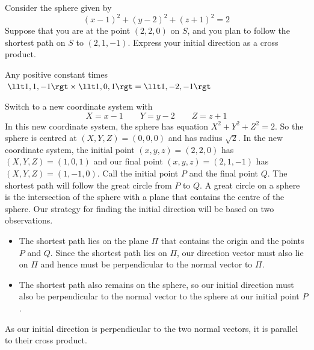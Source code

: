 \begin{question} [M200 2003A] %
Consider the sphere given by
$$
(x-1)^2+(y-2)^2+(z+1)^2=2
$$
Suppose that you are at the point $(2,2,0)$ on $S$, and you plan to follow
the shortest path on $S$ to $(2,1,-1)$. Express your initial direction
as a cross product.
\end{question}

%

\begin{answer}
Any positive constant times
$\llt 1,1,-1\rgt\times\llt 1,0,1\rgt
=\llt 1, -2, -1\rgt$
\end{answer}

\begin{solution}
Switch to a new coordinate system with
$$
X=x-1\qquad Y=y-2\qquad Z=z+1
$$
In this new coordinate system, the sphere has equation $X^2+Y^2+Z^2=2$.
So the sphere is centred at $(X,Y,Z)=(0,0,0)$ and has radius $\sqrt{2}$.
In the new coordinate system, the initial point $(x,y,z)=(2,2,0)$
has $(X,Y,Z)=(1,0,1)$ and our final point  $(x,y,z)=(2,1,-1)$
has $(X,Y,Z)=(1,-1,0)$. Call the initial point $P$ and the final point
$Q$. The shortest path will follow the great circle from $P$ to $Q$.
%
A great circle on a sphere is the intersection of the sphere with a plane
that contains the centre of the sphere. Our strategy for finding the initial
direction will be based on two observations.
\begin{itemize}
\item The shortest path lies on the plane $\Pi$ that contains the origin and the points $P$ and $Q$. Since the shortest path lies on $\Pi$,
our direction vector must also lie on $\Pi$ and hence must
be perpendicular to the normal vector to $\Pi$.
\item
The shortest path also remains on the sphere, so our initial direction
must also be perpendicular to the normal vector to 
the sphere at our initial point $P$. 
\end{itemize}
As our initial direction is perpendicular to the two normal vectors,
it is parallel to their cross product.


\end{solution}
